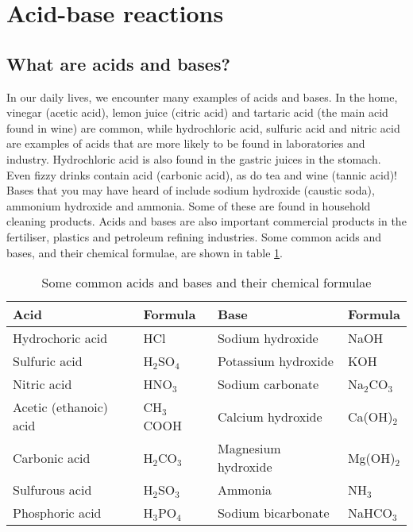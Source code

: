 
\section{Acid-base reactions}
\label{sec:reactiontypes:acid-base}

\subsection{What are acids and bases?}

In our daily lives, we encounter many examples of acids and bases. In the home, vinegar (acetic acid), lemon juice (citric acid) and tartaric acid (the main acid found in wine) are common, while hydrochloric acid, sulfuric acid and nitric acid are examples of acids that are more likely to be found in laboratories and industry. Hydrochloric acid is also found in the gastric juices in the stomach. Even fizzy drinks contain acid (carbonic acid), as do tea and wine (tannic acid)! Bases that you may have heard of include sodium hydroxide (caustic soda), ammonium hydroxide and ammonia. Some of these are found in household cleaning products. Acids and bases are also important commercial products in the fertiliser, plastics and petroleum refining industries. Some common acids and bases, and their chemical formulae, are shown in table \ref{tab:acids and bases}.

\begin{table}[h]
\begin{center}
\caption{Some common acids and bases and their chemical formulae}
\label{tab:acids and bases}

\begin{tabular}{|l|l||l|l|}\hline
\textbf{Acid} & \textbf{Formula} & \textbf{Base} & \textbf{Formula}\\\hline\hline
Hydrochoric acid & HCl & Sodium hydroxide & NaOH \\\hline
Sulfuric acid & H$_{2}$SO$_{4}$ & Potassium hydroxide & KOH \\\hline
Nitric acid & HNO$_{3}$ & Sodium carbonate & Na$_{2}$CO$_{3}$\\\hline
Acetic (ethanoic) acid & CH$_{3}$COOH & Calcium hydroxide & Ca(OH)$_{2}$ \\\hline
Carbonic acid & H$_{2}$CO$_{3}$ & Magnesium hydroxide & Mg(OH)$_{2}$ \\\hline
Sulfurous acid & H$_{2}$SO$_{3}$ & Ammonia & NH$_{3}$ \\\hline
Phosphoric acid & H$_{3}$PO$_{4}$ & Sodium bicarbonate & NaHCO$_{3}$ \\\hline
\end{tabular}
\end{center}
\end{table}

